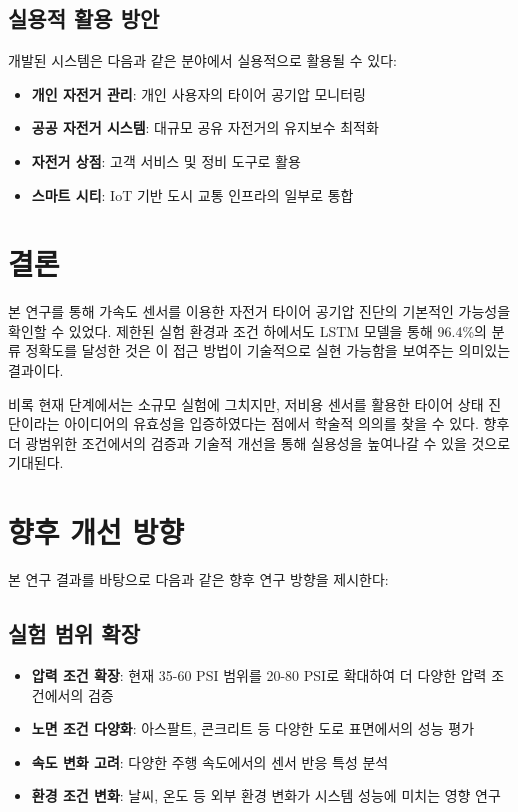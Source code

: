 \documentclass[12pt,a4paper]{article}
\begin{document}
\subsection{실용적 활용 방안}
\label{subsec:practical_application}

개발된 시스템은 다음과 같은 분야에서 실용적으로 활용될 수 있다:

\begin{itemize}
    \item \textbf{개인 자전거 관리}: 개인 사용자의 타이어 공기압 모니터링
    \item \textbf{공공 자전거 시스템}: 대규모 공유 자전거의 유지보수 최적화
    \item \textbf{자전거 상점}: 고객 서비스 및 정비 도구로 활용
    \item \textbf{스마트 시티}: IoT 기반 도시 교통 인프라의 일부로 통합
\end{itemize}

\section{결론}
\label{sec:conclusion}

본 연구를 통해 가속도 센서를 이용한 자전거 타이어 공기압 진단의 기본적인 가능성을 확인할 수 있었다. 제한된 실험 환경과 조건 하에서도 LSTM 모델을 통해 96.4\%의 분류 정확도를 달성한 것은 이 접근 방법이 기술적으로 실현 가능함을 보여주는 의미있는 결과이다.

비록 현재 단계에서는 소규모 실험에 그치지만, 저비용 센서를 활용한 타이어 상태 진단이라는 아이디어의 유효성을 입증하였다는 점에서 학술적 의의를 찾을 수 있다. 향후 더 광범위한 조건에서의 검증과 기술적 개선을 통해 실용성을 높여나갈 수 있을 것으로 기대된다.

\section{향후 개선 방향}
\label{sec:future_work}

본 연구 결과를 바탕으로 다음과 같은 향후 연구 방향을 제시한다:

\subsection{실험 범위 확장}
\label{subsec:scope_expansion}

\begin{itemize}
    \item \textbf{압력 조건 확장}: 현재 35-60 PSI 범위를 20-80 PSI로 확대하여 더 다양한 압력 조건에서의 검증
    \item \textbf{노면 조건 다양화}: 아스팔트, 콘크리트 등 다양한 도로 표면에서의 성능 평가
    \item \textbf{속도 변화 고려}: 다양한 주행 속도에서의 센서 반응 특성 분석
    \item \textbf{환경 조건 변화}: 날씨, 온도 등 외부 환경 변화가 시스템 성능에 미치는 영향 연구
\end{itemize}
\end{document}
